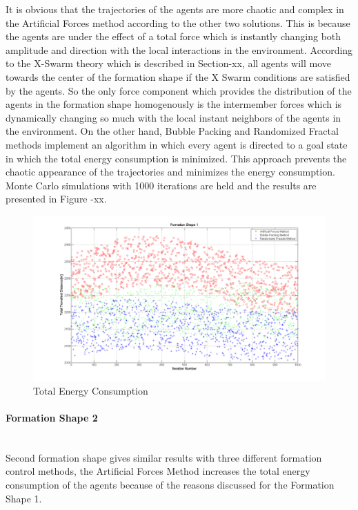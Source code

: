 		It is obvious that the trajectories of the agents are more chaotic and complex in the Artificial Forces method according to the other two solutions. This is because the agents are under the effect of a total force which is instantly changing both amplitude and direction with the local interactions in the environment. According to the X-Swarm theory which is described in Section-xx, all agents will move towards the center of the formation shape if the X Swarm conditions are satisfied by the agents. So the only force component which provides the distribution of the agents in the formation shape homogenously is the intermember forces which is dynamically changing so much with the local instant neighbors of the agents in the environment. On the other hand, Bubble Packing and Randomized Fractal methods implement an algorithm in which every agent is directed to a goal state in which the total energy consumption is minimized. This approach prevents the chaotic appearance of the trajectories and minimizes the energy consumption.
		Monte Carlo simulations with 1000 iterations are held and the results are presented in Figure -xx. 
		
		\begin{figure}[H]
			\caption{Total Energy Consumption}
			\centerline{\includegraphics[scale = 0.35]{Total_Energy_Shape_1}}
		\end{figure} 	
		
		
		
		
		   \paragraph{Formation Shape 2}\hspace{0pt} \\
Second formation shape gives similar results with three different formation control methods, the Artificial Forces Method increases the total energy consumption of the agents because of the reasons discussed for the Formation Shape 1.

